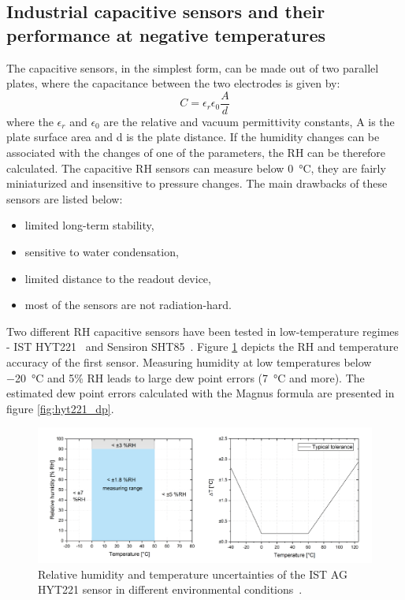 \subsection{Industrial capacitive sensors and their performance at negative temperatures}
\label{capacitive_sensors}
The capacitive sensors, in the simplest form, can be made out of two parallel plates, where the capacitance between the two electrodes is given by:
\begin{equation}
C = \epsilon_{r}\epsilon_0\frac{A}{d}
\end{equation}
where the $\epsilon_{r}$ and $\epsilon_{0}$ are the relative and vacuum permittivity constants, A is the plate surface area and d is the plate distance. If the humidity changes can be associated with the changes of one of the parameters, the \gls{RH} can be therefore calculated. 
The capacitive \gls{RH} sensors can measure below \SI{0}{\celsius}, they are fairly miniaturized and insensitive to pressure changes. The main drawbacks of these sensors are listed below:
\begin{itemize}
    \item limited long-term stability,
    \item sensitive to water condensation,
    \item limited distance to the readout device,
    \item most of the sensors are not radiation-hard.
\end{itemize}
Two different \gls{RH} capacitive sensors have been tested in low-temperature regimes - IST HYT221~\cite{hyt221} and Sensiron SHT85~\cite{SHT85}. Figure \ref{fig:hyt221} depicts the \gls{RH} and temperature accuracy of the first sensor. Measuring humidity at low temperatures below \SI{-20}{\celsius} and 5\% \gls{RH} leads to large dew point errors (\SI{7}{\celsius} and more). The estimated dew point errors calculated with the Magnus formula are presented in figure \ref{fig:hyt221_dp}.
\begin{figure}[!h]
\centering
\includegraphics[width=0.9\columnwidth]{Chapter5/images/hyt221_rh.png}
\caption{Relative humidity and temperature uncertainties of the IST AG HYT221 sensor in different environmental conditions~\cite{hyt221}.}
\label{fig:hyt221}
\end{figure}
